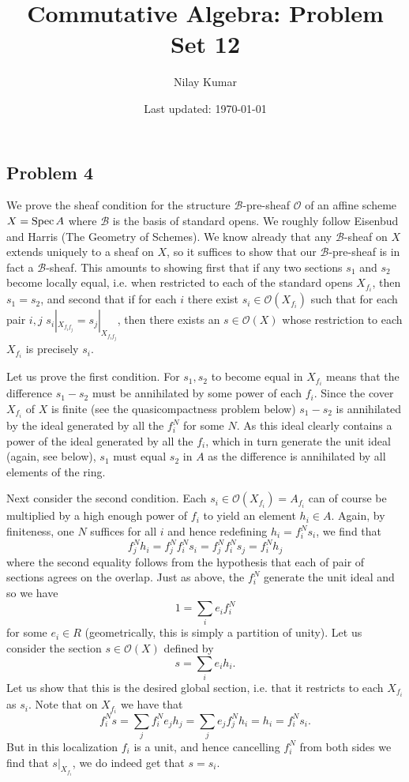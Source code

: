 \documentclass{../../mathnotes}
\title{Commutative Algebra: Problem Set 12}
\author{Nilay Kumar}
\date{Last updated: \today}
\begin{document}
\maketitle

\subsection*{Problem 4}

We prove the sheaf condition for the structure $\mathcal{B}$-pre-sheaf $\mathcal{O}$ of an affine scheme $X=\operatorname{Spec} A$ where $\mathcal{B}$ is the basis of standard opens.
We roughly follow Eisenbud and Harris (The Geometry of Schemes).
We know already that any $\mathcal{B}$-sheaf on $X$ extends uniquely to a sheaf on $X$, so it suffices to show that our $\mathcal{B}$-pre-sheaf is in fact
a $\mathcal{B}$-sheaf. This amounts to showing first that if any two sections $s_1$ and $s_2$ become locally equal, i.e. when restricted to each of the standard
opens $X_{f_i}$, then $s_1=s_2$, and second that if for each $i$ there exist $s_i\in \mathcal{O}(X_{f_i})$ such that for each pair $i,j$ $s_i|_{X_{f_if_j}}=s_j|_{X_{f_if_j}}$,
then there exists an $s\in \mathcal{O}(X)$ whose restriction to each $X_{f_i}$ is precisely $s_i$.

Let us prove the first condition. For $s_1,s_2$ to become equal in $X_{f_i}$ means that the difference $s_1-s_2$ must be annihilated by some power of each $f_i$.
Since the cover $X_{f_i}$ of $X$ is finite (see the quasicompactness problem below) $s_1-s_2$ is annihilated by the ideal generated by all the $f_i^N$ for some
$N$. As this ideal clearly contains a power of the ideal generated by all the $f_i$, which in turn generate the unit ideal (again, see below), $s_1$ must
equal $s_2$ in $A$ as the difference is annihilated by all elements of the ring.

Next consider the second condition. Each $s_i\in \mathcal{O}(X_{f_i})=A_{f_i}$ can of course be multiplied by a high enough power of $f_i$ to yield an element $h_i\in A$.
Again, by finiteness, one $N$ suffices for all $i$ and hence redefining $h_i=f_i^Ns_i$, we find that
\[f_j^Nh_i=f_j^Nf_i^Ns_i=f_j^Nf_i^Ns_j=f_i^Nh_j\]
where the second equality follows from the hypothesis that each of pair of sections agrees on the overlap. Just as above, the $f_i^N$ generate the unit ideal
and so we have
\[1=\sum_i e_if_i^N\]
for some $e_i\in R$ (geometrically, this is simply a partition of unity). Let us consider the section $s\in\mathcal{O}(X)$ defined by
\[s=\sum_i e_i h_i.\]
Let us show that this is the desired global section, i.e. that it restricts to each $X_{f_i}$ as $s_i$. Note that on $X_{f_i}$ we have that
\[f_i^Ns=\sum_j f_i^Ne_jh_j=\sum_je_jf_j^Nh_i=h_i=f_i^Ns_i.\]
But in this localization $f_i$ is a unit, and hence cancelling $f_i^N$ from both sides we find that $s|_{X_{f_i}}$, we do indeed get that $s=s_i$.
\end{document}
